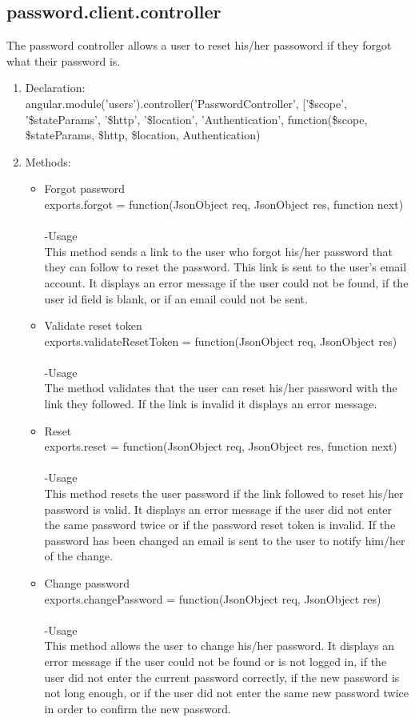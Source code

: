 \documentclass[a4paper,12pt]{article}
\begin{document}
 \subsection{password.client.controller}
 The password controller allows a user to reset his/her passoword if they forgot what their password is. 
 \begin{enumerate}
 \item Declaration:\\angular.module('users').controller('PasswordController', ['\$scope', '\$stateParams', '\$http', '\$location', 'Authentication',
	function(\$scope, \$stateParams, \$http, \$location, Authentication) 
	\item Methods:
	\begin{itemize}
	\item Forgot password\\ 
 exports.forgot = function(JsonObject req, JsonObject res, function next)\\ \\
 -Usage\\
 This method sends a link to the user who forgot his/her password that they can follow to reset the password. This link is sent to the user's email account. It displays an error message if the user could not be found, if the user id field is blank, or if an email could not be sent.
 \item Validate reset token\\
 exports.validateResetToken = function(JsonObject req, JsonObject res)\\ \\
 -Usage\\
 The method validates that the user can reset his/her password with the link they followed. If the link is invalid it displays an error message.\\
 \item Reset\\
 exports.reset = function(JsonObject req, JsonObject res, function next)\\ \\
 -Usage\\
 This method resets the user password if the link followed to reset his/her password is valid. It displays an error message if the user did not enter the same password twice or if the password reset token is invalid. If the password has been changed an email is sent to the user to notify him/her of the change.
 \item Change password\\
 exports.changePassword = function(JsonObject req, JsonObject res)\\  \\
 -Usage\\
 This method allows the user to change his/her password. It displays an error message if the user could not be found or is not logged in, if the user did not enter the current password correctly, if the new password is not long enough, or if the user did not enter the same new password twice in order to confirm the new password.
	\end{itemize}
 \end{enumerate}
\end{document}
